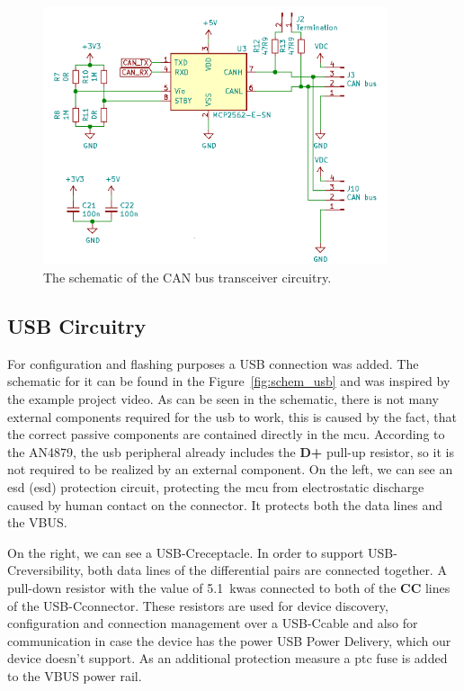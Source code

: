 \begin{figure}[H]
    \centering
    \includegraphics[width=0.9\textwidth]{obrazky/schem_can}
    \caption{The schematic of the CAN bus transceiver circuitry.}
    \label{fig:schem_can}
\end{figure}

\subsection{USB Circuitry}
\label{subsec:usb_circuitry}
For configuration and flashing purposes a USB connection was added.
The schematic for it can be found in the Figure~\ref{fig:schem_usb} and was inspired by the example project video\cite{salmony_kicad_2020}.
As can be seen in the schematic, there is not many external components required for the \acs{usb} to work, this is caused by the fact, that the correct passive components are contained directly in the \acs{mcu}.
According to the AN4879\cite{stmicro_an4879_2018}, the \acs{usb} peripheral already includes the \textbf{D+} pull-up resistor, so it is not required to be realized by an external component.
On the left, we can see an \acs{esd} (\acl{esd}) protection circuit, protecting the \acs{mcu} from electrostatic discharge caused by human contact on the connector.
It protects both the data lines and the VBUS.

On the right, we can see a USB-C\texttrademark receptacle.
In order to support USB-C\texttrademark reversibility, both data lines of the differential pairs are connected together.
A pull-down resistor with the value of 5.1~k\textohm was connected to both of the \textbf{CC} lines of the USB-C\texttrademark connector.
These resistors are used for device discovery, configuration and connection management over a USB-C\texttrademark cable and also for communication in case the device has the power USB Power Delivery\cite{stmicro_ta0357_2018}, which our device doesn't support.
As an additional protection measure a \acs{ptc} fuse is added to the VBUS power rail.

